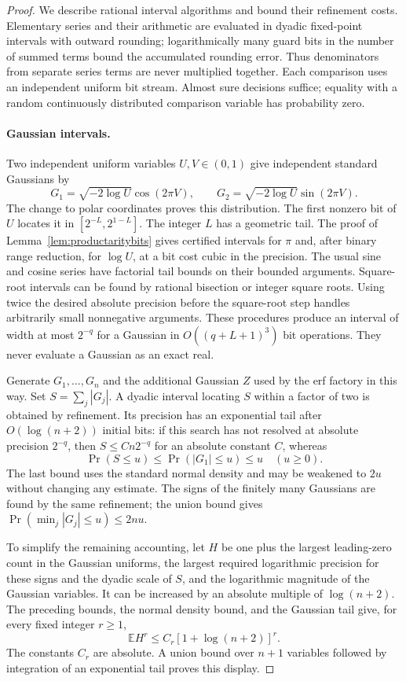 \begin{proof}
We describe rational interval algorithms and bound their refinement
costs. Elementary series and their arithmetic are evaluated in dyadic
fixed-point intervals with outward rounding; logarithmically many guard
bits in the number of summed terms bound the accumulated rounding error.
Thus denominators from separate series terms are never multiplied together.
Each comparison uses an independent uniform bit stream. Almost
sure decisions suffice; equality with a random continuously distributed
comparison variable has probability zero.

\paragraph{Gaussian intervals.}
Two independent uniform variables $U,V\in(0,1)$ give independent standard
Gaussians by
\[
 G_1=\sqrt{-2\log U}\cos(2\pi V),\qquad
 G_2=\sqrt{-2\log U}\sin(2\pi V).
\]
The change to polar coordinates proves this distribution. The first
nonzero bit of $U$ locates it in $[2^{-L},2^{1-L}]$. The integer $L$
has a geometric tail. The proof of Lemma~\ref{lem:productaritybits}
gives certified intervals for $\pi$ and, after binary range reduction,
for $\log U$, at a bit cost cubic in the precision. The
usual sine and cosine series have factorial tail bounds on their
bounded arguments. Square-root intervals can be found by rational
bisection or integer square roots. Using twice the desired absolute
precision before the square-root step handles arbitrarily small
nonnegative arguments.
These procedures produce an interval of width at most $2^{-q}$ for a
Gaussian in $O((q+L+1)^3)$ bit operations. They never evaluate a
Gaussian as an exact real.

Generate $G_1,\ldots,G_n$ and the additional Gaussian $Z$ used by the
erf factory in this way. Set $S=\sum_j|G_j|$. A dyadic interval locating
$S$ within a factor of two is obtained by refinement. Its precision has
an exponential tail after $O(\log(n+2))$ initial bits: if this search has
not resolved at absolute precision $2^{-q}$, then
$S\le Cn2^{-q}$ for an absolute constant $C$, whereas
\[
 \Pr(S\le u)\le\Pr(|G_1|\le u)\le u
 \quad(u\ge0).
\]
The last bound uses the standard normal density and may be weakened to
$2u$ without changing any estimate. The signs of the finitely many
Gaussians are found by the same refinement; the union bound gives
$\Pr(\min_j|G_j|\le u)\le2nu$.

To simplify the remaining accounting, let $H$ be one plus the largest
leading-zero count in the Gaussian uniforms, the largest required
logarithmic precision for these signs and the dyadic scale of $S$, and
the logarithmic magnitude of the Gaussian variables. It can be
increased by an absolute multiple of $\log(n+2)$. The preceding bounds,
the normal density bound, and the Gaussian tail give, for every fixed
integer $r\ge1$,
\begin{equation}
 \mathbb E H^r\le C_r[1+\log(n+2)]^r.
 \label{eq:gaussianHmoments}
\end{equation}
The constants $C_r$ are absolute. A union bound over $n+1$ variables
followed by integration of an exponential tail proves this display.


\end{proof}
